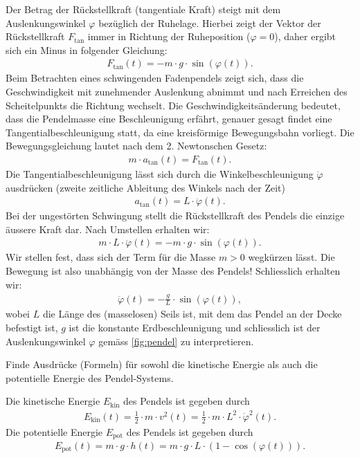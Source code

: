 \par
Der Betrag der Rückstellkraft (tangentiale Kraft) steigt mit dem Auslenkungswinkel $\varphi$ bezüglich der Ruhelage. Hierbei zeigt der Vektor der Rückstellkraft $F_{\text{tan}}$ immer in Richtung der Ruheposition ($\varphi = 0$), daher ergibt sich ein Minus in folgender Gleichung:
\begin{align*}
  F_{\text{tan}}(t) = -m\cdot g\cdot \sin(\varphi (t)).
\end{align*}
Beim Betrachten eines schwingenden Fadenpendels zeigt sich, dass die Geschwindigkeit mit zunehmender Auslenkung abnimmt und nach Erreichen des Scheitelpunkts die Richtung wechselt. Die Geschwindigkeitsänderung bedeutet, dass die Pendelmasse eine Beschleunigung erfährt, genauer gesagt findet eine Tangentialbeschleunigung statt, da eine kreisförmige Bewegungsbahn vorliegt. Die Bewegungsgleichung lautet nach dem 2. Newtonschen Gesetz:
\begin{align*}
  m\cdot a_{\text{tan}}(t) = F_{\text{tan}}(t).
\end{align*}
Die Tangentialbeschleunigung lässt sich durch die Winkelbeschleunigung $\ddot{\varphi}$ ausdrücken (zweite zeitliche Ableitung des Winkels nach der Zeit)
\begin{align*}
  a_{\text{tan}}(t) = L\cdot\ddot{\varphi}(t).
\end{align*}
Bei der ungestörten Schwingung stellt die Rückstellkraft des Pendels die einzige äussere Kraft dar. Nach Umstellen erhalten wir:
\begin{align*}
  m\cdot L\cdot \ddot{\varphi}(t) = -m\cdot g\cdot \sin(\varphi (t)).
\end{align*}
Wir stellen fest, dass sich der Term für die Masse $m>0$ wegkürzen lässt. Die Bewegung ist also unabhängig von der Masse des Pendels! Schliesslich erhalten wir:
\begin{align}\label{eq:pendel}
  \ddot{\varphi} (t) = -\frac{g}{L}\cdot\sin(\varphi (t)),
\end{align}
wobei $L$ die Länge des (masselosen) Seils ist, mit dem das Pendel an der Decke befestigt ist, $g$ ist die konstante Erdbeschleunigung und schliesslich ist der Auslenkungswinkel $\varphi$ gemäss \cref{fig:pendel} zu interpretieren.

\begin{mychallenge}
  Finde Ausdrücke (Formeln) für sowohl die kinetische Energie als auch die potentielle Energie des Pendel-Systems.
  \begin{myanswer}
    Die kinetische Energie $E_\mathrm{kin}$ des Pendels ist gegeben durch
    \begin{align*}
      E_\mathrm{kin}(t) = \frac{1}{2}\cdot m\cdot v^2(t) = \frac{1}{2}\cdot m\cdot L^2\cdot \dot{\varphi}^2(t).
    \end{align*}
    Die potentielle Energie $E_\mathrm{pot}$ des Pendels ist gegeben durch
    \begin{align*}
      E_\mathrm{pot}(t) = m\cdot g\cdot h(t) = m\cdot g\cdot L\cdot (1-\cos(\varphi(t))).
    \end{align*}
  \end{myanswer} 
\end{mychallenge}

